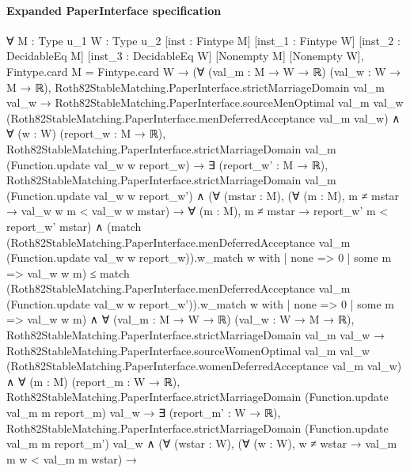 \documentclass[10pt]{article}
\begin{document}
\paragraph{Expanded PaperInterface specification}
\begin{ReviewVerbatim}
∀ {M : Type u_1} {W : Type u_2} [inst : Fintype M] [inst_1 : Fintype W] [inst_2 : DecidableEq M]
  [inst_3 : DecidableEq W] [Nonempty M] [Nonempty W],
  Fintype.card M = Fintype.card W →
    (∀ (val_m : M → W → ℝ) (val_w : W → M → ℝ),
        Roth82StableMatching.PaperInterface.strictMarriageDomain val_m val_w →
          Roth82StableMatching.PaperInterface.sourceMenOptimal val_m val_w
              (Roth82StableMatching.PaperInterface.menDeferredAcceptance val_m val_w) ∧
            ∀ (w : W) (report_w : M → ℝ),
              Roth82StableMatching.PaperInterface.strictMarriageDomain val_m (Function.update val_w w report_w) →
                ∃ (report_w' : M → ℝ),
                  Roth82StableMatching.PaperInterface.strictMarriageDomain val_m (Function.update val_w w report_w') ∧
                    (∀ (mstar : M),
                        (∀ (m : M), m ≠ mstar → val_w w m < val_w w mstar) →
                          ∀ (m : M), m ≠ mstar → report_w' m < report_w' mstar) ∧
                      (match
                          (Roth82StableMatching.PaperInterface.menDeferredAcceptance val_m
                                (Function.update val_w w report_w)).w_match
                            w with
                        | none => 0
                        | some m => val_w w m) ≤
                        match
                          (Roth82StableMatching.PaperInterface.menDeferredAcceptance val_m
                                (Function.update val_w w report_w')).w_match
                            w with
                        | none => 0
                        | some m => val_w w m) ∧
      ∀ (val_m : M → W → ℝ) (val_w : W → M → ℝ),
        Roth82StableMatching.PaperInterface.strictMarriageDomain val_m val_w →
          Roth82StableMatching.PaperInterface.sourceWomenOptimal val_m val_w
              (Roth82StableMatching.PaperInterface.womenDeferredAcceptance val_m val_w) ∧
            ∀ (m : M) (report_m : W → ℝ),
              Roth82StableMatching.PaperInterface.strictMarriageDomain (Function.update val_m m report_m) val_w →
                ∃ (report_m' : W → ℝ),
                  Roth82StableMatching.PaperInterface.strictMarriageDomain (Function.update val_m m report_m') val_w ∧
                    (∀ (wstar : W),
                        (∀ (w : W), w ≠ wstar → val_m m w < val_m m wstar) →

\end{ReviewVerbatim}
\end{document}
